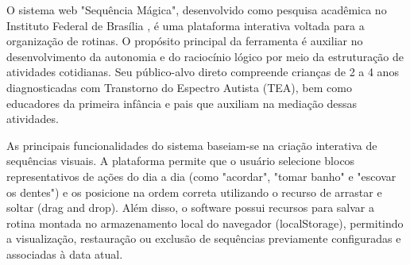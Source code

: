 O sistema web "Sequência Mágica", desenvolvido como pesquisa acadêmica no Instituto Federal de Brasília \cite{santos2025}, é uma plataforma interativa voltada para a organização de rotinas. O propósito principal da ferramenta é auxiliar no desenvolvimento da autonomia e do raciocínio lógico por meio da estruturação de atividades cotidianas. Seu público-alvo direto compreende crianças de 2 a 4 anos diagnosticadas com Transtorno do Espectro Autista (TEA), bem como educadores da primeira infância e pais que auxiliam na mediação dessas atividades.

As principais funcionalidades do sistema baseiam-se na criação interativa de sequências visuais. A plataforma permite que o usuário selecione blocos representativos de ações do dia a dia (como "acordar", "tomar banho" e "escovar os dentes") e os posicione na ordem correta utilizando o recurso de arrastar e soltar (drag and drop). Além disso, o software possui recursos para salvar a rotina montada no armazenamento local do navegador (localStorage), permitindo a visualização, restauração ou exclusão de sequências previamente configuradas e associadas à data atual.

